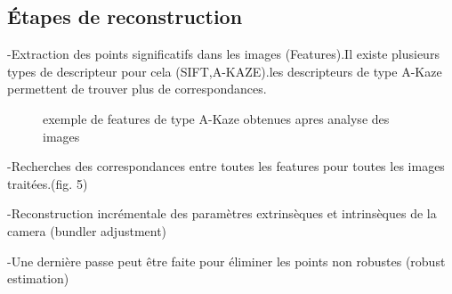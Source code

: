 \documentclass[a4paper,10pt,french]{sphinxhowto}
\begin{document}
\subsection{\textbf{Étapes de reconstruction}}
\label{Sfm:etapes-de-reconstruction}
-Extraction des points significatifs dans les images (Features).Il existe plusieurs types de descripteur pour cela (SIFT,A-KAZE).les descripteurs de type A-Kaze permettent de trouver plus de correspondances.
\begin{figure}[htbp]
\centering
\capstart

\caption{exemple de features de type A-Kaze obtenues apres analyse des images}\end{figure}

-Recherches des correspondances entre toutes les features pour toutes les images traitées.(fig. 5)

-Reconstruction incrémentale des paramètres extrinsèques et intrinsèques de la camera (bundler adjustment)

-Une dernière passe peut être faite pour éliminer les points non robustes (robust estimation)
\end{document}
